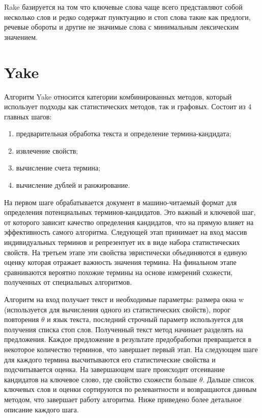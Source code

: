 Rake базируется на том что ключевые слова чаще всего представляют собой несколько слов и редко содержат пунктуацию и стоп слова такие как предлоги, речевые обороты и другие не значимые слова с минимальным лексическим значением. \cite{15}

\section{Yake}

Алгоритм Yake относится категории комбинированных методов, который использует подходы как статистических методов, так и графовых. 
Состоит из 4 главных шагов:
\begin{enumerate}
	\item предварительная обработка текста и определение термина-кандидата;
	\item извлечение свойств;
	\item вычисление счета термина;
	\item вычисление дублей и ранжирование.
\end{enumerate}
На первом шаге обрабатывается документ в машино-читаемый формат для определения потенциальных терминов-кандидатов.
Это важный и ключевой шаг, от которого зависит качество определения кандидатов, что на прямую влияет на эффективность самого алгоритма.
Следующей этап принимает на вход массив индивидуальных терминов и репрезентует их в виде набора статистических свойств.
На третьем этапе эти свойства эвристически объединяются в единую оценку которая отражает важность значения термина.
На финальном этапе сравниваются вероятно похожие термины на основе измерений схожести, полученных от специальных алгоритмов.

Алгоритм на вход получает текст и необходимые параметры: размера окна w (используется для вычисления одного из статистических свойств), порог повторения $\theta$ и язык текста, последний строчный параметр используется для получения списка стоп слов.
Полученный текст метод начинает разделять на предложения.
Каждое предложение в результате предобработки превращается в некоторое количество терминов, что завершает первый этап.
На следующем шаге для каждого термина высчитываются его статистические свойства и подсчитывается оценка.
На завершающем шаге происходит отсеивание кандидатов на ключевое слово, где свойство схожести больше $\theta$.
Дальше список ключевых слов и оценки сортируются по релевантности и возвращаются данным методом, что завершает работу алгоритма.
Ниже приведено более детальное описание каждого шага.

